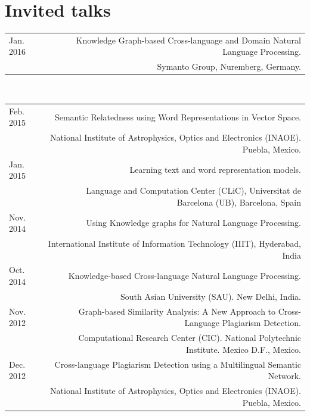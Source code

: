 \documentclass[10pt]{article}
\begin{document}
\section*{Invited talks}
\begin{tabular}{L!{\VRule}R}
Jan. 2016&Knowledge Graph-based Cross-language and Domain Natural Language Processing.\\
&\scriptsize{Symanto Group, Nuremberg, Germany.} \vspace{5pt}\\
\end{tabular}
\\
\begin{tabular}{L!{\VRule}R}
Feb. 2015&Semantic Relatedness using Word Representations in Vector Space.\\
&\scriptsize{National Institute of Astrophysics, Optics and Electronics (INAOE). Puebla, Mexico.} \vspace{5pt}\\
Jan. 2015&Learning text and word representation models.\\
&\scriptsize{Language and Computation Center (CLiC), Universitat de Barcelona (UB), Barcelona, Spain} \vspace{5pt}\\
Nov. 2014&Using Knowledge graphs for Natural Language Processing.\\
&\scriptsize{International Institute of Information Technology (IIIT), Hyderabad, India} \vspace{5pt}\\
Oct. 2014&Knowledge-based Cross-language Natural Language Processing.\\
&\scriptsize{South Asian University (SAU). New Delhi, India.} \vspace{5pt}\\
Nov. 2012&Graph-based Similarity Analysis: A New Approach to Cross-Language Plagiarism Detection.\\
&\scriptsize{Computational Research Center (CIC). National Polytechnic Institute. Mexico D.F., Mexico.} \vspace{5pt}\\
Dec. 2012&Cross-language Plagiarism Detection using a Multilingual Semantic Network.\\
&\scriptsize{National Institute of Astrophysics, Optics and Electronics (INAOE). Puebla, Mexico.} \vspace{5pt}\\
\end{tabular}
\end{document}
